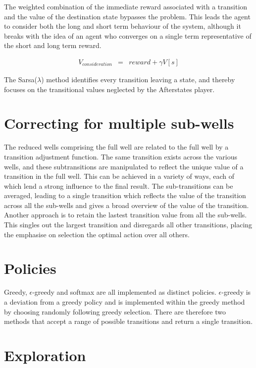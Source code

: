 \documentclass{rucsthesis}
\begin{document}
The weighted combination of the immediate reward associated with a transition and the value of the destination state bypasses the problem. This leads the agent to consider both the long and short term behaviour of the system, although it breaks with the idea of an agent who converges on a single term representative of the short and long term reward.

\begin{eqnarray*}
V_{consideration} & = & reward + \gamma V[s]
\end{eqnarray*} 
 
The Sarsa($\lambda$) method identifies every transition leaving a state, and thereby focuses on the transitional values neglected by the Afterstates player.

\section{Correcting for multiple sub-wells}

The reduced wells comprising the full well are related to the full well by a transition adjustment function. The same transition exists across the various wells, and these subtransitions are manipulated to reflect the unique value of a transition in the full well. This can be achieved in a variety of ways, each of which lend a strong influence to the final result. The sub-transitions can be averaged, leading to a single transition which reflects the value of the transition across all the sub-wells and gives a broad overview of the value of the transition. Another approach is to retain the lastest transition value from all the sub-wells. This singles out the largest transition and disregards all other transitions, placing the emphasise on selection the optimal action over all others.

\section{Policies}

Greedy, $\epsilon$-greedy and softmax are all implemented as distinct policies. $\epsilon$-greedy is a deviation from a greedy policy and is implemented within the greedy method by choosing randomly following greedy selection. There are therefore two methods that accept a range of possible transitions and return a single transition.

\section{Exploration}
\end{document}
